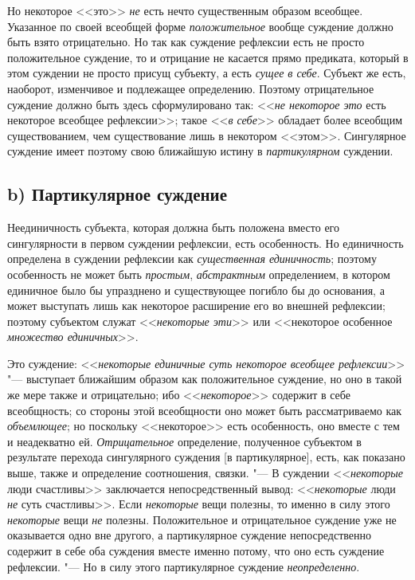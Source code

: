 {Но некоторое <<это>>
{\em не} есть нечто
существенным образом всеобщее. Указанное по своей всеобщей форме
{\em положительное}
вообще суждение должно быть взято отрицательно. Но так как
суждение рефлексии есть не просто положительное суждение, то и отрицание не
касается прямо предиката, который в этом суждении не просто присущ
субъекту, а есть {\em сущее в себе}.
Субъект же есть, наоборот, изменчивое и подлежащее
определению. Поэтому отрицательное суждение должно быть здесь
сформулировано так: <<{\em не некоторое
это} есть некоторое всеобщее
рефлексии>>;
такое <<{\em в себе}>>
обладает более всеобщим существованием, чем существование
лишь в некотором <<этом>>. Сингулярное суждение имеет поэтому свою ближайшую
истину в {\em партикулярном}
суждении.

\subsection[b) Партикулярное суждение]{b) Партикулярное суждение}
Неединичность субъекта, которая должна быть положена вместо
его сингулярности в первом суждении рефлексии, есть особенность. Но
единичность определена в суждении рефлексии как
{\em существенная единичность};
поэтому особенность не может быть
{\em простым},
{\em абстрактным}
определением, в котором единичное было бы упразднено и
существующее погибло бы до основания, а может выступать лишь как некоторое
расширение его во внешней рефлексии; поэтому субъектом служат
<<{\em некоторые эти}>> или
<<некоторое особенное {\em множество
единичных}>>.

Это суждение:
<<{\em некоторые единичные суть некоторое
всеобщее рефлексии}>> "--- выступает ближайшим образом как
положительное суждение, но оно в такой же мере также и отрицательно; ибо
<<{\em некоторое}>>
содержит в себе всеобщность; со стороны этой всеобщности оно
может быть рассматриваемо как
{\em объемлющее}; но
поскольку <<некоторое>> есть особенность, оно вместе с тем и неадекватно ей.
{\em Отрицательное}
определение, полученное субъектом в результате перехода
сингулярного суждения [в партикулярное], есть, как показано выше, также и
определение соотношения, связки. "--- В суждении
<<{\em некоторые} люди
счастливы>> заключается непосредственный вывод:
<<{\em некоторые} люди
{\em не} суть счастливы>>.
Если {\em некоторые} вещи
полезны, то именно в силу этого
{\em некоторые} вещи
{\em не} полезны.
Положительное и отрицательное суждение уже не оказывается одно вне другого,
а партикулярное суждение непосредственно содержит в себе оба суждения
вместе именно потому, что оно есть суждение рефлексии. "--- Но
в силу этого партикулярное суждение
{\em неопределенно}.

}
